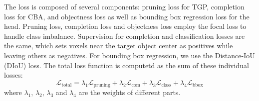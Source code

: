 The loss is composed of several components: pruning loss for TGP, completion loss for CBA, and objectness loss as well as bounding box regression loss for the head. Pruning loss, completion loss and objectness loss employ the focal loss to handle class imbalance. 
Supervision for completion and classification losses are the same, which sets voxels near the target object center as positives while leaving others as negatives. 
For bounding box regression, we use the Distance-IoU (DIoU) loss. The total loss function is computetd as the sum of these individual losses:
\[
\mathcal{L}_{\text{total}} = \lambda_1\mathcal{L}_{\text{pruning}} + \lambda_2\mathcal{L}_{\text{com}} + \lambda_3\mathcal{L}_{\text{class}} + \lambda_4\mathcal{L}_{\text{bbox}}
\]
where \(\lambda_1\), \(\lambda_2\), \(\lambda_3\) and \(\lambda_4\) are the weights of different parts.
